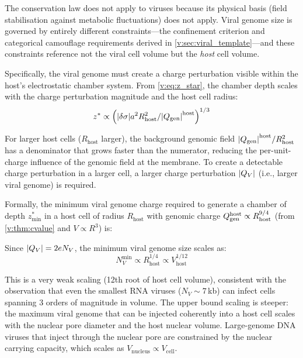 The conservation law does not apply to viruses because its physical basis (field stabilisation against metabolic fluctuations) does not apply. Viral genome size is governed by entirely different constraints---the confinement criterion and categorical camouflage requirements derived in \cref{v:sec:viral_template}---and these constraints reference not the viral cell volume but the \emph{host} cell volume.

Specifically, the viral genome must create a charge perturbation visible within the host's electrostatic chamber system. From \cref{v:eq:z_star}, the chamber depth scales with the charge perturbation magnitude and the host cell radius:
\begin{equation}
  z^{*} \propto \left(\abs{\delta\sigma} a^2 R_{\mathrm{host}}^2 / \abs{Q_{\mathrm{gen}}}^{\mathrm{host}}\right)^{1/3}
\end{equation}

For larger host cells ($R_{\mathrm{host}}$ larger), the background genomic field $\abs{Q_{\mathrm{gen}}}^{\mathrm{host}} / R_{\mathrm{host}}^2$ has a denominator that grows faster than the numerator, reducing the per-unit-charge influence of the genomic field at the membrane. To create a detectable charge perturbation in a larger cell, a larger charge perturbation $\abs{Q_V}$ (i.e., larger viral genome) is required.

Formally, the minimum viral genome charge required to generate a chamber of depth $z^{*}_{\mathrm{min}}$ in a host cell of radius $R_{\mathrm{host}}$ with genomic charge $Q_{\mathrm{gen}}^{\mathrm{host}} \propto R_{\mathrm{host}}^{9/4}$ (from \cref{v:thm:cvalue} and $V \propto R^3$) is:

Since $\abs{Q_V} = 2e N_V$, the minimum viral genome size scales as:
\begin{equation}
  N_V^{\mathrm{min}} \propto R_{\mathrm{host}}^{1/4} \propto V_{\mathrm{host}}^{1/12}
\end{equation}

This is a very weak scaling (12th root of host cell volume), consistent with the observation that even the smallest RNA viruses ($N_V \sim 7$\,kb) can infect cells spanning 3 orders of magnitude in volume. The upper bound scaling is steeper: the maximum viral genome that can be injected coherently into a host cell scales with the nuclear pore diameter and the host nuclear volume. Large-genome DNA viruses that inject through the nuclear pore are constrained by the nuclear carrying capacity, which scales as $V_{\mathrm{nucleus}} \propto V_{\mathrm{cell}}$.

